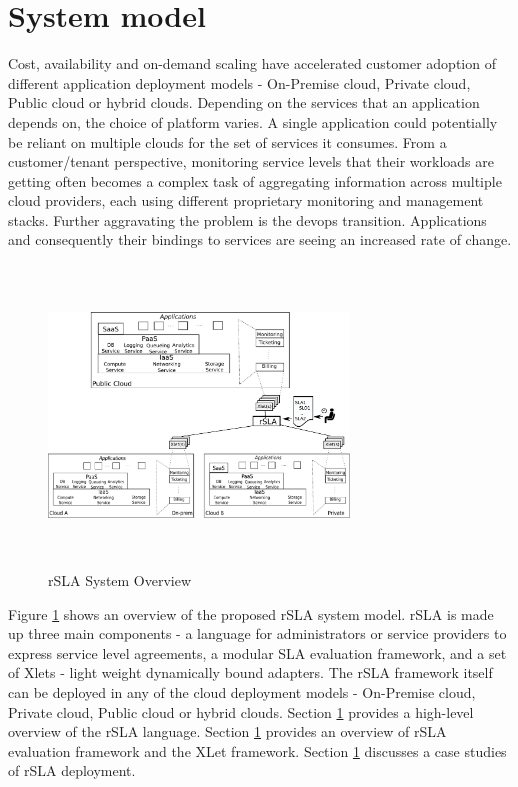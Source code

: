 \section{System model}
Cost, availability and on-demand scaling have accelerated customer adoption of different application deployment models - On-Premise cloud, Private cloud, Public cloud or hybrid clouds. Depending on the services that an application depends on, the choice of platform varies. A single application could potentially be reliant on multiple clouds for the set of services it consumes. From a customer/tenant perspective, monitoring service levels that their workloads are getting often becomes a complex task of aggregating information across multiple cloud providers, each using different proprietary monitoring and management stacks. Further aggravating the problem is the devops transition. Applications and consequently their bindings to services are seeing an increased rate of change. 
\begin{figure}[H]
\centering
 \includegraphics[width=8cm,height=8cm]{pics/systemModel.pdf} 
 \caption{rSLA System Overview}
 \label{fig:systemModel}
\end{figure}
Figure \ref{fig:systemModel} shows an overview of the proposed rSLA system model. rSLA is made up three main components - a language for administrators or service providers to express service level agreements, a modular SLA evaluation framework, and a set of Xlets - light weight dynamically bound adapters. The rSLA framework itself can be deployed in any of the cloud deployment models - On-Premise cloud, Private cloud, Public cloud or hybrid clouds. Section \ref{} provides a high-level overview of the rSLA language. Section \ref{} provides an overview of rSLA evaluation framework and the XLet framework. Section \ref{} discusses a case studies of rSLA deployment.

